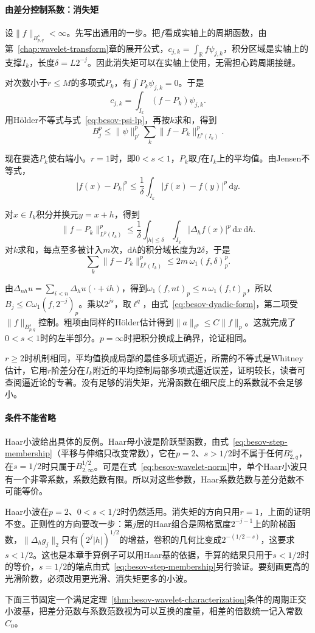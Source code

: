 \paragraph{由差分控制系数：消失矩}
设$\lVert f\rVert_{B^s_{p,q}}<\infty$。先写出通用的一步。把$f$看成实轴上的周期函数，由第~\ref{chap:wavelet-transform}章的展开公式，$c_{j,k}=\int_{\mathbb R}f\psi_{j,k}$，积分区域是实轴上的支撑$I_k$，长度$\delta=L2^{-j}$。因此消失矩可以在实轴上使用，无需担心跨周期接缝。

对次数小于$r\leq M$的多项式$P_k$，有$\int P_k\psi_{j,k}=0$。于是
\[
 c_{j,k}=\int_{I_k}(f-P_k)\psi_{j,k} .
\]
用Hölder不等式与式~\eqref{eq:besov-psi-lp}，再按$k$求和，得到
\[
 B_j^p\leq\lVert\psi\rVert_{p'}^p\sum_k\lVert f-P_k\rVert_{L^p(I_k)}^p .
\]

现在要选$P_k$使右端小。$r=1$时，即$0<s<1$，$P_k$取$f$在$I_k$上的平均值。由Jensen不等式，
\[
 \lvert f(x)-P_k\rvert^p\leq\frac1\delta\int_{I_k}\lvert f(x)-f(y)\rvert^p\,\mathrm dy .
\]

对$x\in I_k$积分并换元$y=x+h$，得到
\[
 \lVert f-P_k\rVert_{L^p(I_k)}^p\leq\frac1\delta\int_{\lvert h\rvert\leq\delta}\int_{I_k}\lvert\Delta_hf(x)\rvert^p\,\mathrm dx\,\mathrm dh .
\]
对$k$求和，每点至多被计入$m$次，$\mathrm dh$的积分域长度为$2\delta$，于是
\[
 \sum_k\lVert f-P_k\rVert_{L^p(I_k)}^p\leq2m\,\omega_1(f,\delta)_p^p .
\]

由$\Delta_{nh}u=\sum_{i<n}\Delta_hu(\cdot+ih)$，得到$\omega_1(f,nt)_p\leq n\,\omega_1(f,t)_p$，所以$B_j\leq C\omega_1(f,2^{-j})_p$。乘以$2^{js}$，取$\ell^q$，由式~\eqref{eq:besov-dyadic-form}，第二项受$\lVert f\rVert_{B^s_{p,q}}$控制。粗项由同样的Hölder估计得到$\lVert a\rVert_{\ell^p}\leq C\lVert f\rVert_p$。这就完成了$0<s<1$时的左半部分。$p=\infty$时把积分换成上确界，论证相同。

$r\geq2$时机制相同，平均值换成局部的最佳多项式逼近，所需的不等式是Whitney估计，它用$r$阶差分在$I_k$附近的平均控制局部多项式逼近误差，证明较长，读者可查阅逼近论的专著。没有足够的消失矩，光滑函数在细尺度上的系数就不会足够小。

\paragraph{条件不能省略}
Haar小波给出具体的反例。Haar母小波是阶跃型函数，由式~\eqref{eq:besov-step-membership}（平移与伸缩只改变常数），它在$p=2$、$s>1/2$时不属于任何$B^s_{2,q}$，在$s=1/2$时只属于$B^{1/2}_{2,\infty}$。可是在式~\eqref{eq:besov-wavelet-norm}中，单个Haar小波只有一个非零系数，系数范数有限。所以对这些参数，Haar系数范数与差分范数不可能等价。

Haar小波在$p=2$、$0<s<1/2$时仍然适用。消失矩的方向只用$r=1$，上面的证明不变。正则性的方向要改一步：第$j$层的Haar组合是网格宽度$2^{-j-1}$上的阶梯函数，$\lVert\Delta_hg_j\rVert_2$只有$(2^j\lvert h\rvert)^{1/2}$的增益，卷积的几何比变成$2^{-(1/2-s)}$，这要求$s<1/2$。这也是本章手算例子可以用Haar基的依据，手算的结果只用于$s<1/2$时的等价，$s=1/2$的端点由式~\eqref{eq:besov-step-membership}另行验证。要刻画更高的光滑阶数，必须改用更光滑、消失矩更多的小波。

下面三节固定一个满足定理~\ref{thm:besov-wavelet-characterization}条件的周期正交小波基，把差分范数与系数范数视为可以互换的度量，相差的倍数统一记入常数$C_0$。
